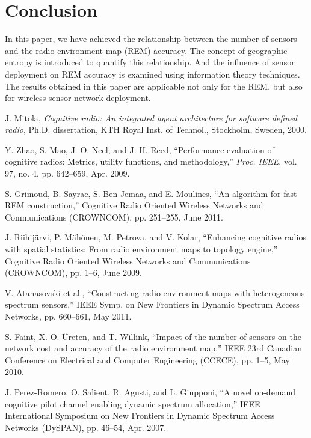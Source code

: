 \documentclass[conference]{IEEEtran}
\begin{document}
\section{Conclusion}

In this paper, we have achieved the relationship between the number of sensors and the radio environment map (REM) accuracy.
The concept of geographic entropy is introduced to quantify this relationship.
And the influence of sensor deployment on REM accuracy is examined using information theory techniques.
The results obtained in this paper are applicable not only for the REM, but also for wireless sensor network deployment.

\begin{thebibliography}{99}

J. Mitola,
{\em Cognitive radio: An integrated agent architecture for software defined radio},
Ph.D. dissertation, KTH Royal Inst. of Technol., Stockholm, Sweden, 2000.

Y. Zhao, S. Mao, J. O. Neel, and J. H. Reed,
``Performance evaluation of cognitive radios: Metrics, utility functions, and methodology,''
{\em Proc. IEEE}, vol. 97, no. 4, pp. 642--659, Apr. 2009.

S. Grimoud, B. Sayrac, S. Ben Jemaa, and E. Moulines, ``An algorithm for fast REM construction,''
Cognitive Radio Oriented Wireless Networks and Communications (CROWNCOM), pp. 251--255, June 2011.

J. Riihij\"{a}rvi, P. M\"{a}h\"{o}nen, M. Petrova, and V. Kolar,
``Enhancing cognitive radios with spatial statistics: From radio environment maps to topology engine,''
Cognitive Radio Oriented Wireless Networks and Communications (CROWNCOM),
pp. 1--6, June 2009.

V. Atanasovski et al.,
``Constructing radio environment maps with heterogeneous spectrum sensors,''
IEEE Symp. on New Frontiers in Dynamic Spectrum Access Networks,
pp. 660--661, May 2011.

S. Faint, X. O. \"{U}reten, and T. Willink,
``Impact of the number of sensors on the network cost and accuracy of the radio environment map,''
IEEE 23rd Canadian Conference on Electrical and Computer Engineering (CCECE),
pp. 1--5, May 2010.

J. Perez-Romero, O. Salient, R. Agusti, and L. Giupponi,
``A novel on-demand cognitive pilot channel enabling dynamic spectrum allocation,''
IEEE International Symposium on New Frontiers in Dynamic Spectrum Access Networks (DySPAN),
pp. 46--54, Apr. 2007.


\end{thebibliography}
\end{document}

